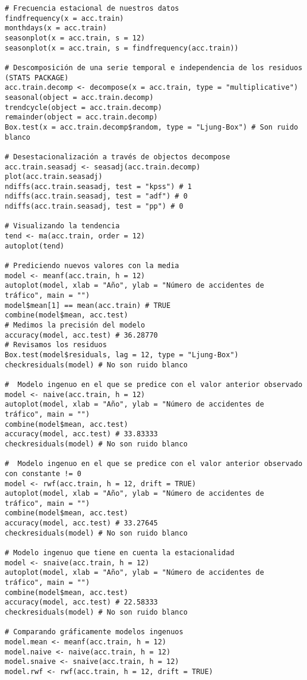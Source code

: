 \documentclass[12pt,a4paper,oneside]{article}
\begin{document}
\begin{Verbatim}[fontsize=\footnotesize]
# Frecuencia estacional de nuestros datos
findfrequency(x = acc.train)
monthdays(x = acc.train)
seasonplot(x = acc.train, s = 12)
seasonplot(x = acc.train, s = findfrequency(acc.train))

# Descomposición de una serie temporal e independencia de los residuos (STATS PACKAGE)
acc.train.decomp <- decompose(x = acc.train, type = "multiplicative")
seasonal(object = acc.train.decomp)
trendcycle(object = acc.train.decomp)
remainder(object = acc.train.decomp)
Box.test(x = acc.train.decomp$random, type = "Ljung-Box") # Son ruido blanco

# Desestacionalización a través de objectos decompose
acc.train.seasadj <- seasadj(acc.train.decomp)
plot(acc.train.seasadj)
ndiffs(acc.train.seasadj, test = "kpss") # 1
ndiffs(acc.train.seasadj, test = "adf") # 0
ndiffs(acc.train.seasadj, test = "pp") # 0

# Visualizando la tendencia
tend <- ma(acc.train, order = 12)
autoplot(tend)

# Prediciendo nuevos valores con la media
model <- meanf(acc.train, h = 12)
autoplot(model, xlab = "Año", ylab = "Número de accidentes de tráfico", main = "")
model$mean[1] == mean(acc.train) # TRUE
combine(model$mean, acc.test)
# Medimos la precisión del modelo
accuracy(model, acc.test) # 36.28770
# Revisamos los residuos
Box.test(model$residuals, lag = 12, type = "Ljung-Box")
checkresiduals(model) # No son ruido blanco

#  Modelo ingenuo en el que se predice con el valor anterior observado
model <- naive(acc.train, h = 12)
autoplot(model, xlab = "Año", ylab = "Número de accidentes de tráfico", main = "")
combine(model$mean, acc.test)
accuracy(model, acc.test) # 33.83333
checkresiduals(model) # No son ruido blanco

#  Modelo ingenuo en el que se predice con el valor anterior observado con constante != 0
model <- rwf(acc.train, h = 12, drift = TRUE)
autoplot(model, xlab = "Año", ylab = "Número de accidentes de tráfico", main = "")
combine(model$mean, acc.test)
accuracy(model, acc.test) # 33.27645
checkresiduals(model) # No son ruido blanco

# Modelo ingenuo que tiene en cuenta la estacionalidad
model <- snaive(acc.train, h = 12)
autoplot(model, xlab = "Año", ylab = "Número de accidentes de tráfico", main = "")
combine(model$mean, acc.test)
accuracy(model, acc.test) # 22.58333
checkresiduals(model) # No son ruido blanco

# Comparando gráficamente modelos ingenuos
model.mean <- meanf(acc.train, h = 12)
model.naive <- naive(acc.train, h = 12)
model.snaive <- snaive(acc.train, h = 12)
model.rwf <- rwf(acc.train, h = 12, drift = TRUE)


\end{Verbatim}
\end{document}
